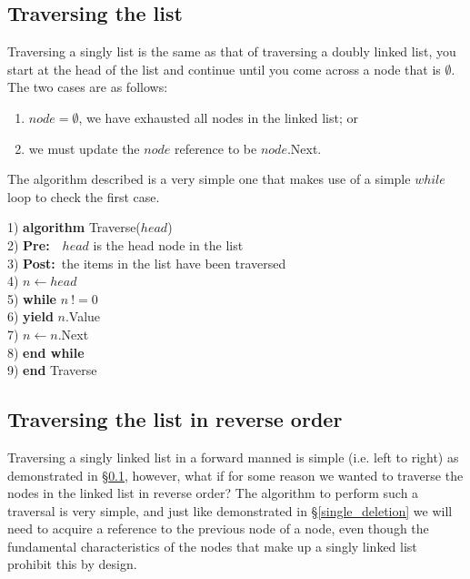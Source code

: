 \subsection{Traversing the list} \label{singly_linked_traversal}
Traversing a singly list is the same as that of traversing a doubly linked list, you start at the head of the list and continue until you come across a node that is $\emptyset$. The two cases are as follows:
\begin{enumerate}
\item $node = \emptyset$, we have exhausted all nodes in the linked list; or
\item we must update the $node$ reference to be $node$.Next.
\end{enumerate}

The algorithm described is a very simple one that makes use of a simple $while$ loop to check the first case.

\newpage
\begin{tabbing}
1)  \textbf{alg}\= \textbf{orithm} Traverse($head$) \\
2)  \> \textbf{Pre:}~~$head$ is the head node in the list \\
3)  \> \textbf{Post:}~the items in the list have been traversed \\
4)  \> $n \leftarrow head$ \\
5)  \> \textbf{whi}\=\textbf{le} $n~!= 0$ \\
6)  \> \> \textbf{yield} $n$.Value \\
7)  \> \> $n \leftarrow n$.Next \\
8)  \> \textbf{end while} \\
9)  \textbf{end} Traverse \\
\end{tabbing}

\subsection{Traversing the list in reverse order}
Traversing a singly linked list in a forward manned is simple (i.e. left to right) as demonstrated in \S\ref{singly_linked_traversal}, however, what if for some reason we wanted to traverse the nodes in the linked list in reverse order? The algorithm to perform such a traversal is very simple, and just like demonstrated in \S\ref{single_deletion} we will need to acquire a reference to the previous node of a node, even though the fundamental characteristics of the nodes that make up a singly linked list prohibit this by design.

